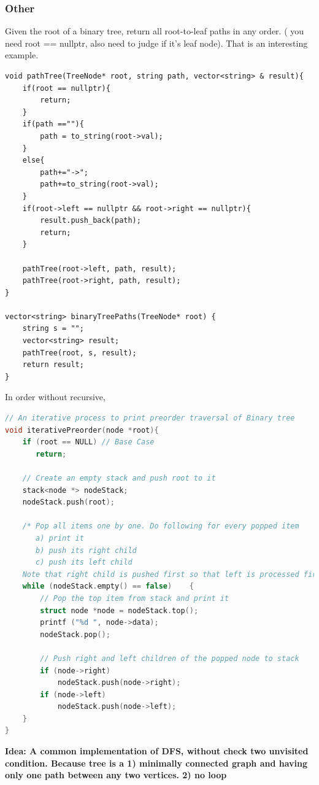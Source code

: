 \documentclass[a4paper,11pt,twoside]{book}
\begin{document}
\subsubsection{Other}

		
	\par Given the root of a binary tree, return all root-to-leaf paths in any order. ( you need root == nullptr, also need to judge if it's leaf node). That is an interesting example.  

\begin{lstlisting}
void pathTree(TreeNode* root, string path, vector<string> & result){
	if(root == nullptr){
		return;
	}
	if(path ==""){
		path = to_string(root->val);
	}
	else{
		path+="->";
		path+=to_string(root->val);
	}
	if(root->left == nullptr && root->right == nullptr){
		result.push_back(path);
		return;
	}
	
	pathTree(root->left, path, result);
	pathTree(root->right, path, result);
}

vector<string> binaryTreePaths(TreeNode* root) {
	string s = "";
	vector<string> result;
	pathTree(root, s, result);
	return result;
}
\end{lstlisting}


	\par In order without recursive, 
\begin{lstlisting}[frame=single, language=c++]
// An iterative process to print preorder traversal of Binary tree
void iterativePreorder(node *root){
    if (root == NULL) // Base Case
       return;
 
    // Create an empty stack and push root to it
    stack<node *> nodeStack;
    nodeStack.push(root);
 
    /* Pop all items one by one. Do following for every popped item
       a) print it
       b) push its right child
       c) push its left child
    Note that right child is pushed first so that left is processed first */
    while (nodeStack.empty() == false)    {
        // Pop the top item from stack and print it
        struct node *node = nodeStack.top();
        printf ("%d ", node->data);
        nodeStack.pop();
 
        // Push right and left children of the popped node to stack
        if (node->right)
            nodeStack.push(node->right);
        if (node->left)
            nodeStack.push(node->left);
    }
}
\end{lstlisting}

\textbf{Idea: A common implementation of DFS, without check two unvisited condition. Because tree is a 1) minimally connected graph and having only one path between any two vertices. 2) no loop}
\end{document}
